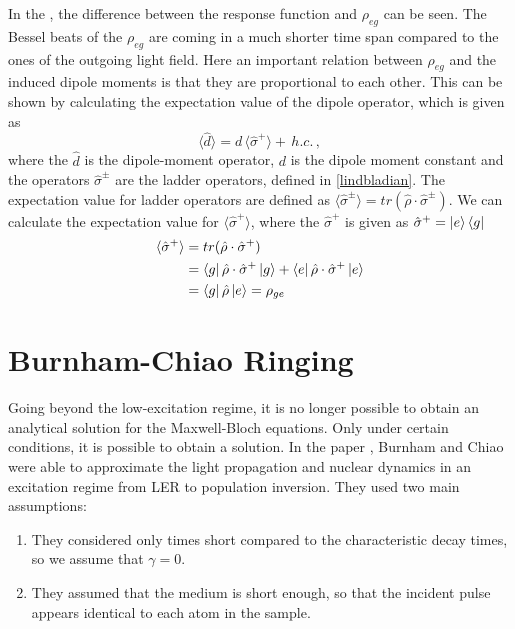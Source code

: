 In the , the difference between the response function and $\rho_{eg}$ can be seen. The Bessel beats of the $\rho_{eg}$ are coming in a much shorter time span compared to the ones of the outgoing light field. Here an important relation between $\rho_{eg}$ and the induced dipole moments is that they are proportional to each other. This can be shown by calculating the expectation value of the dipole operator, which is given as \cite{Scully_Zubairy_1997}
\begin{equation}
    \langle \hat{d}\rangle= d \, \langle\hat{\sigma}^{+}\rangle + \, h.c. \, ,
\end{equation}
where the $\hat{d}$ is the dipole-moment operator, $d$ is the dipole moment constant and the operators $\hat{\sigma}^{\pm}$ are the ladder operators, defined in \cref{lindbladian}. The expectation value for ladder operators are defined as $ \langle\hat{\sigma}^{\pm}\rangle  = tr(\hat{\rho} \cdot \hat{\sigma}^{\pm})$. We can calculate the expectation value for $\langle\hat{\sigma}^{+}\rangle $, where the $\hat{\sigma}^{+}$ is given as $\hat{\sigma}^{+} = \ket{e} \bra{g} $
\begin{align}
    \langle\hat{\sigma}^{+}\rangle  &= tr(\hat{\rho} \cdot \hat{\sigma}^{+})\\
    &=\bra{g} \hat{\rho} \cdot \hat{\sigma}^+\ket{g} + \bra{e} \hat{\rho} \cdot \hat{\sigma}^+\ket{e}\\
    &= \bra{g} \hat{\rho}\ket{e} = \rho_{ge}
\end{align}
 
\section{Burnham-Chiao Ringing}\label{section:burnhamchiao} 
Going beyond the low-excitation regime, it is no longer possible to obtain an analytical solution for the Maxwell-Bloch equations. Only under certain conditions, it is possible to obtain a solution. In the paper \cite{BURNHAM1969}, Burnham and Chiao were able to approximate the light propagation and nuclear dynamics in an excitation regime from LER to population inversion. They used two main assumptions:
\begin{enumerate}
    \item They considered only times short compared to the characteristic decay times, so we assume that $\gamma= 0$.
    \item They assumed that the medium is short enough, so that the incident pulse appears identical to each atom in the sample.
\end{enumerate}

